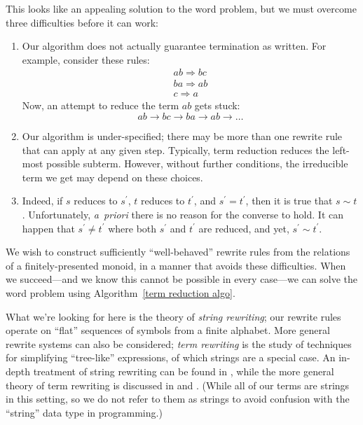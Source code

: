 \documentclass[../generics]{subfiles}
\begin{document}
\begin{quote}
\end{quote}
This looks like an appealing solution to the word problem, but we must overcome three difficulties before it can work:
\begin{enumerate}
\item Our algorithm does not actually guarantee termination as written. For example, consider these rules:
\begin{gather*}
ab\Rightarrow bc\\
ba\Rightarrow ab\\
c\Rightarrow a
\end{gather*}
Now, an attempt to reduce the term $ab$ gets stuck:
\[ab\rightarrow bc\rightarrow ba\rightarrow ab\rightarrow\ldots\]

\item Our algorithm is under-specified; there may be more than one rewrite rule that can apply at any given step. Typically, term reduction reduces the left-most possible subterm. However, without further conditions, the irreducible term we get may depend on these choices.

\item Indeed, if $s$ reduces to $s^\prime$, $t$ reduces to $t^\prime$, and $s^\prime=t^\prime$, then it is true that $s\sim t$. Unfortunately, \emph{a~priori} there is no reason for the converse to hold. It can happen that $s^\prime\neq t^\prime$ where both $s^\prime$ and $t^\prime$ are reduced, and yet, $s^\prime\sim t^\prime$.

\end{enumerate}

We wish to construct sufficiently ``well-behaved'' rewrite rules from the relations of a finitely-presented monoid, in a manner that avoids these difficulties. When we succeed---and we know this cannot be possible in every case---we can solve the word problem using Algorithm~\ref{term reduction algo}.

What we're looking for here is the theory of \emph{string rewriting}; our rewrite rules operate on ``flat'' sequences of symbols from a finite alphabet. More general rewrite systems can also be considered; \emph{term rewriting} is the study of techniques for simplifying ``tree-like'' expressions, of which strings are a special case. An in-depth treatment of string rewriting can be found in \cite{book2012string}, while the more general theory of term rewriting is discussed in \cite{andallthat} and \cite{formalmans6}. (While all of our terms are strings in this setting, so we do not refer to them as strings to avoid confusion with the ``string'' data type in programming.)
\end{document}
